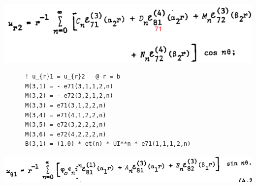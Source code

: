 \documentclass [11pt,spanish]{article}
\begin{document}
\includegraphics[scale=0.5]{ur2}
\begingroup
\fontsize{10pt}{12pt}
\selectfont
{}
\begin{shaded}
\begin{verbatim}
      ! u_{r}1 = u_{r}2   @ r = b
      M(3,1) = - e71(3,1,1,2,n) 
      M(3,2) = - e72(3,2,1,2,n) 
      M(3,3) = e71(3,1,2,2,n)
      M(3,4) = e71(4,1,2,2,n) 
      M(3,5) = e72(3,2,2,2,n)
      M(3,6) = e72(4,2,2,2,n)
      B(3,1) = (1.0) * et(n) * UI**n * e71(1,1,1,2,n)
\end{verbatim}
\end{shaded}
\endgroup
\includegraphics[scale=0.5]{ut1}
\end{document}
